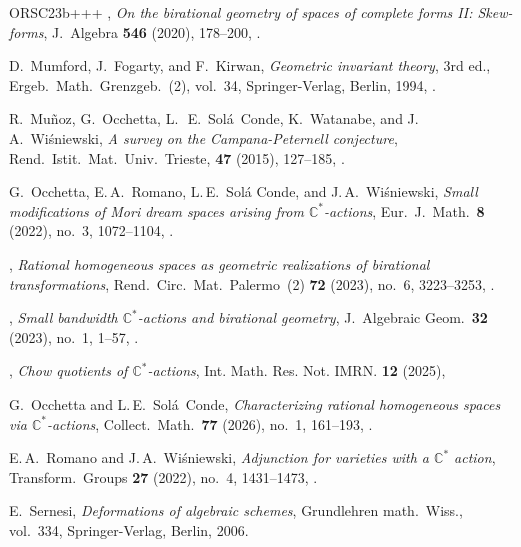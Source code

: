 \documentclass[11pt]{amsart}
\numberwithin{equation}{section}
\theoremstyle{definition}
\theoremstyle{remark}
\begin{document}
\begin{thebibliography}{ORSC\etalchar{+}23b+++}
\bysame,
\emph{On the birational geometry of spaces of complete forms {II}:
  {S}kew-forms}, 
J.~Algebra \textbf{546} (2020), 178--200,
.

D.~Mumford, J.~Fogarty, and F.~Kirwan, 
\emph{Geometric invariant theory}, 3rd ed., Ergeb.\ Math.\ Grenzgeb.~(2), 
vol.~34,  Springer-Verlag, Berlin, 1994,
.

R.~Mu{\~n}oz, G.~Occhetta, L.\,~E.~Sol{\'a}~Conde, K.~Watanabe,
  and J.\,A.~Wi\'sniewski, 
\emph{A survey on the Campana-Peternell conjecture}, 
Rend.\ Istit.\ Mat.\ Univ.\ Trieste, \textbf{47} (2015), 127--185,
.

 G.~Occhetta, E.\,A.~Romano, L.\,E.~Sol\'a Conde, and J.\,A.~Wi\'sniewski, 
\emph{Small modifications of Mori dream spaces arising from
  {$\mathbb{C}^*$}-actions}, 
Eur.~J.\ Math.\ \textbf{8} (2022), no.~3, 1072--1104,
.



\bysame, 
\emph{Rational homogeneous spaces as geometric realizations of birational
  transformations}, 
Rend.\ Circ.\ Mat.\ Palermo~(2) \textbf{72} (2023), no.~6, 3223--3253, 
.

\bysame, 
\emph{Small bandwidth {$\mathbb C^*$}-actions and birational geometry}, 
J.~Algebraic Geom.\ \textbf{32} (2023), no.~1, 1--57,
.

\bysame, 
\emph{Chow quotients of $\mathbb{C}^*$-actions}, 
Int. Math. Res. Not. IMRN. \textbf{12} (2025), 

G.~Occhetta and L.\,E.~Sol{\'a}~Conde, 
\emph{Characterizing rational homogeneous spaces via {$\mathbb
  C^*$}-actions}, 
Collect.\ Math.\ \textbf{77} (2026), no.~1, 161--193,
.

E.\,A.~Romano and J.\,A.~Wi\'{s}niewski, 
\emph{Adjunction for varieties with a {$\mathbb{C}^*$} action}, 
Transform.\ Groups \textbf{27} (2022), no.~4, 1431--1473,
.

E.~Sernesi, 
\emph{Deformations of algebraic schemes},
Grundlehren math.\ Wiss.,  vol.~334, 
Springer-Verlag, Berlin, 2006.


\end{thebibliography}
\end{document}
